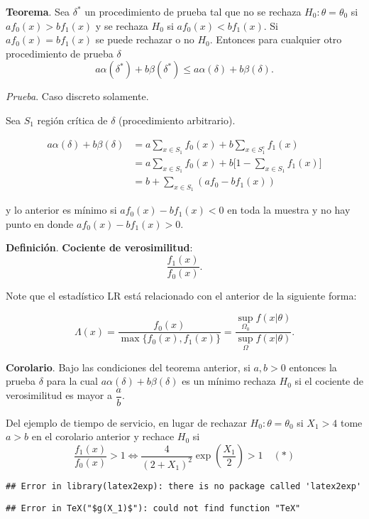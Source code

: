 \documentclass[
  12pt,
]{book}
\begin{document}
\textbf{Teorema}. Sea \(\delta^*\) un procedimiento de prueba tal que no se rechaza \(H_0:\theta=\theta_0\) si \(af_0(x) > bf_1(x)\) y se rechaza \(H_0\) si \(af_0(x) < bf_1(x)\). Si \(af_0(x) = bf_1(x)\) se puede rechazar o no \(H_0\). Entonces para cualquier otro procedimiento de prueba \(\delta\)
\[a\alpha(\delta^*) + b\beta(\delta^*) \leq a\alpha(\delta) + b\beta(\delta). \]

\emph{Prueba}. Caso discreto solamente.

Sea \(S_1\) región crítica de \(\delta\) (procedimiento arbitrario).

\begin{align*}
a\alpha(\delta) + b\beta(\delta) & = a\sum_{x\in S_1}f_0(x) + b\sum_{x\in S_1^c}f_1(x) \\
& = a\sum_{x\in S_1}f_0(x) + b\bigg[1-\sum_{x\in S_1}f_1(x)\bigg]\\
& = b + \sum_{x\in S_1}(af_0-bf_1(x)) 
\end{align*}

y lo anterior es mínimo si \(af_0(x)-bf_1(x)<0\) en toda la muestra y no hay punto en donde \(af_0(x)-bf_1(x)>0\).

\textbf{Definición}. \textbf{Cociente de verosimilitud}:
\[\dfrac{f_1(x)}{f_0(x)}.\]

Note que el estadístico LR está relacionado con el anterior de la siguiente forma:

\[\Lambda(x) = \dfrac{f_0(x)}{\max\{f_0(x),f_1(x)\}} = \dfrac{\sup_{\Omega_0}f(x|\theta)}{\sup_{\Omega}f(x|\theta)}.\]

\textbf{Corolario}. Bajo las condiciones del teorema anterior, si \(a,b>0\) entonces la prueba \(\delta\) para la cual \(a\alpha(\delta) + b\beta(\delta)\) es un mínimo rechaza \(H_0\) si el cociente de verosimilitud es mayor a \(\dfrac ab\).

Del ejemplo de tiempo de servicio, en lugar de rechazar \(H_0: \theta = \theta_0\) si \(X_1>4\) tome \(a>b\) en el corolario anterior y rechace \(H_0\) si
\[\dfrac{f_1(x)}{f_0(x)}>1\Leftrightarrow \dfrac 4{(2+X_1)^2}\exp\left(\dfrac{X_1}2\right)>1\quad(*)\]

\begin{verbatim}
## Error in library(latex2exp): there is no package called 'latex2exp'
\end{verbatim}

\begin{verbatim}
## Error in TeX("$g(X_1)$"): could not find function "TeX"
\end{verbatim}
\end{document}
